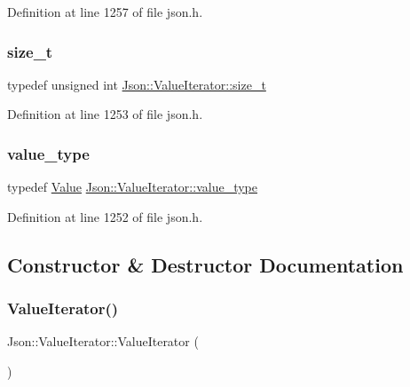 Definition at line 1257 of file json.\+h.

\mbox{\label{class_json_1_1_value_iterator_a308b8932ffc83eaa9d12dadd5c11a7dd}} 
\subsubsection{\texorpdfstring{size\+\_\+t}{size\_t}}
{\footnotesize\ttfamily typedef unsigned int \hyperlink{class_json_1_1_value_iterator_a308b8932ffc83eaa9d12dadd5c11a7dd}{Json\+::\+Value\+Iterator\+::size\+\_\+t}}



Definition at line 1253 of file json.\+h.

\mbox{\label{class_json_1_1_value_iterator_a2c5ba7be611f05546530c8a88b2d2e37}} 
\subsubsection{\texorpdfstring{value\+\_\+type}{value\_type}}
{\footnotesize\ttfamily typedef \hyperlink{class_json_1_1_value}{Value} \hyperlink{class_json_1_1_value_iterator_a2c5ba7be611f05546530c8a88b2d2e37}{Json\+::\+Value\+Iterator\+::value\+\_\+type}}



Definition at line 1252 of file json.\+h.



\subsection{Constructor \& Destructor Documentation}
\mbox{\label{class_json_1_1_value_iterator_a09425cf4dc12244072a942f290a5c0ec}} 
\subsubsection{\texorpdfstring{Value\+Iterator()}{ValueIterator()}\hspace{0.1cm}{\footnotesize\ttfamily [1/4]}}
{\footnotesize\ttfamily Json\+::\+Value\+Iterator\+::\+Value\+Iterator (\begin{DoxyParamCaption}{ }\end{DoxyParamCaption})}



